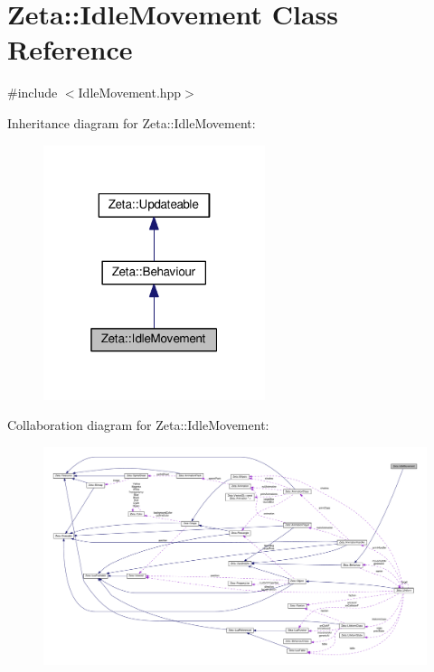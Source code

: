 \hypertarget{classZeta_1_1IdleMovement}{\section{Zeta\+:\+:Idle\+Movement Class Reference}
\label{classZeta_1_1IdleMovement}
}


{\ttfamily \#include $<$Idle\+Movement.\+hpp$>$}



Inheritance diagram for Zeta\+:\+:Idle\+Movement\+:\nopagebreak
\begin{figure}[H]
\begin{center}
\leavevmode
\includegraphics[width=184pt]{classZeta_1_1IdleMovement__inherit__graph}
\end{center}
\end{figure}


Collaboration diagram for Zeta\+:\+:Idle\+Movement\+:
\nopagebreak
\begin{figure}[H]
\begin{center}
\leavevmode
\includegraphics[width=350pt]{classZeta_1_1IdleMovement__coll__graph}
\end{center}
\end{figure}
